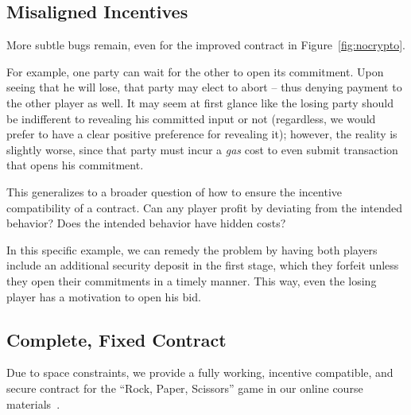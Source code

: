 \documentclass[10pt,twocolumn,letterpaper]{article}
\newcommand{\anote}[1]{{\color{magenta}{[AM: #1]}}}
\newcommand{\ignore}[1]{}
\begin{document}
\subsection{Misaligned Incentives}
\label{sec:incentive}
More subtle bugs remain, even for the improved contract in Figure~\ref{fig:nocrypto}.

For example, one party can 
wait for the other to open its commitment. Upon
seeing that he will lose, that party may elect
to abort -- thus denying payment
to the other player as well. 
It may seem at first glance like the losing party should be indifferent to revealing his committed input or not (regardless, we would prefer to have a clear positive preference for revealing it); however, the reality is slightly worse, since that party must incur a \emph{gas} cost to even submit transaction that opens his commitment.

This generalizes to a broader question of how to 
ensure the incentive compatibility of a contract.
Can any player profit by deviating from the intended behavior?
Does the intended behavior have hidden costs?

In this specific example, we can remedy the problem
by having both players include an additional security deposit in the first stage,
which they forfeit unless they open their commitments in a timely manner.
This way, even the losing player has a motivation to open his bid.

\subsection{Complete, Fixed Contract} 
Due to space constraints, 
we provide a fully working, incentive compatible, and secure 
contract for  the ``Rock, Paper, Scissors'' game
in our online course materials~\cite{anonymous}. 


\ignore{
\subsection{Ethereum-specific Mistakes}
Several subtle details about Ethereum's implementation make smart contract programming prone to error. 

For example, one Ethereum can send messages to each other, 
\begin{verbatim}
def test_callstack(): return(1)

if self.test_callstack() != 1: return(-1)
\end{verbatim} 
The improved contract in Figure~\ref{fig:nocrypt}



}
\end{document}

